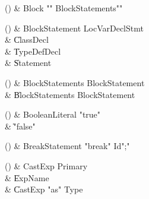 \begin{bbgrammarappendix}

() & Block \label{prod:Block}  \: \xcd"{" BlockStatements\opt \xcd"}"  \\


\end{bbgrammarappendix}

\begin{bbgrammarappendix}

() & BlockStatement \label{prod:BlockStatement}  \: LocVarDeclStmt  \\

 &    \| ClassDecl \\
 &    \| TypeDefDecl \\
 &    \| Statement \\

\end{bbgrammarappendix}

\begin{bbgrammarappendix}

() & BlockStatements \label{prod:BlockStatements}  \: BlockStatement  \\

 &    \| BlockStatements BlockStatement \\

\end{bbgrammarappendix}

\begin{bbgrammarappendix}

() & BooleanLiteral \label{prod:BooleanLiteral}  \: \xcd"true"   \\

 &    \| \xcd"false"  \\

\end{bbgrammarappendix}

\begin{bbgrammarappendix}

() & BreakStatement \label{prod:BreakStatement}  \: \xcd"break" Id\opt \xcd";"  \\


\end{bbgrammarappendix}

\begin{bbgrammarappendix}

() & CastExp \label{prod:CastExp}  \: Primary  \\

 &    \| ExpName \\
 &    \| CastExp \xcd"as" Type \\

\end{bbgrammarappendix}

